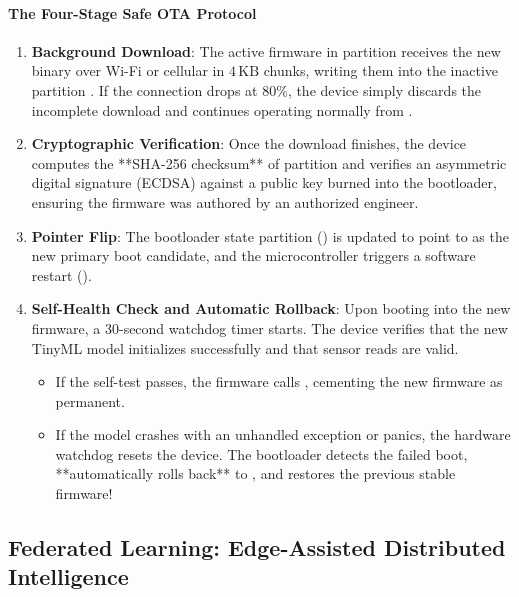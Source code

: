 \paragraph{The Four-Stage Safe OTA Protocol}
\begin{enumerate}
    \item \textbf{Background Download}: The active firmware in partition  receives the new binary over Wi-Fi or cellular in $4\,\text{KB}$ chunks, writing them into the inactive partition . If the connection drops at $80\%$, the device simply discards the incomplete download and continues operating normally from .
    \item \textbf{Cryptographic Verification}: Once the download finishes, the device computes the **SHA-256 checksum** of partition  and verifies an asymmetric digital signature (ECDSA) against a public key burned into the bootloader, ensuring the firmware was authored by an authorized engineer.
    \item \textbf{Pointer Flip}: The bootloader state partition () is updated to point to  as the new primary boot candidate, and the microcontroller triggers a software restart ().
    \item \textbf{Self-Health Check and Automatic Rollback}: Upon booting into the new firmware, a 30-second watchdog timer starts. The device verifies that the new TinyML model initializes successfully and that sensor reads are valid. 
    \begin{itemize}
        \item If the self-test passes, the firmware calls , cementing the new firmware as permanent.
        \item If the model crashes with an unhandled exception or panics, the hardware watchdog resets the device. The bootloader detects the failed boot, **automatically rolls back** to , and restores the previous stable firmware!
    \end{itemize}
\end{enumerate}

\subsection{Federated Learning: Edge-Assisted Distributed Intelligence}\label{subsec:federated_learning}

